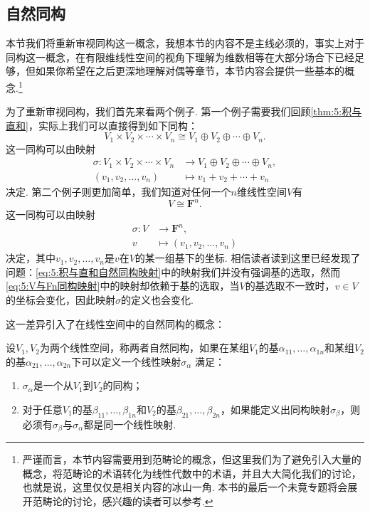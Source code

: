 \subsection{自然同构}

本节我们将重新审视同构这一概念，我想本节的内容不是主线必须的，事实上对于同构这一概念，在有限维线性空间的视角下理解为维数相等在大部分场合下已经足够，但如果你希望在之后更深地理解对偶等章节，本节内容会提供一些基本的概念.\footnote{严谨而言，本节内容需要用到范畴论的概念，但这里我们为了避免引入大量的概念，将范畴论的术语转化为线性代数中的术语，并且大大简化我们的讨论，也就是说，这里仅仅是相关内容的冰山一角. 本书的最后一个未竟专题将会展开范畴论的讨论，感兴趣的读者可以参考.}

为了重新审视同构，我们首先来看两个例子. 第一个例子需要我们回顾\autoref{thm:5:积与直和}，实际上我们可以直接得到如下同构：
\begin{equation} \label{eq:5:积与直和自然同构}
    V_1\times V_2\times\cdots\times V_n\cong V_1\oplus V_2\oplus\cdots\oplus V_n.
\end{equation}
这一同构可以由映射
\begin{equation} \label{eq:5:积与直和自然同构映射}
    \begin{aligned}
        \sigma:V_1\times V_2\times\cdots\times V_n&\to V_1\oplus V_2\oplus\cdots\oplus V_n,\\
        (v_1,v_2,\ldots,v_n)&\mapsto v_1+v_2+\cdots+v_n
    \end{aligned}
\end{equation}
决定. 第二个例子则更加简单，我们知道对任何一个$n$维线性空间$V$有
\begin{equation} \label{eq:5:V与Fn同构}
    V\cong\mathbf{F}^n.
\end{equation}
这一同构可以由映射
\begin{equation} \label{eq:5:V与Fn同构映射}
    \begin{aligned}
        \sigma:V&\to\mathbf{F}^n,\\
        v&\mapsto(v_1,v_2,\ldots,v_n)
    \end{aligned}
\end{equation}
决定，其中$v_1,v_2,\ldots,v_n$是$v$在$V$的某一组基下的坐标. 相信读者读到这里已经发现了问题：\autoref{eq:5:积与直和自然同构映射}中的映射我们并没有强调基的选取，然而\autoref{eq:5:V与Fn同构映射}中的映射却依赖于基的选取，当$V$的基选取不一致时，$v\in V$的坐标会变化，因此映射$\sigma$的定义也会变化.

这一差异引入了在线性空间中的自然同构的概念：
\begin{definition}
    设$V_1,V_2$为两个线性空间，称两者自然同构，如果在某组$V_1$的基$\alpha_{11},\ldots,\alpha_{1n}$和某组$V_2$的基$\alpha_{21},\ldots,\alpha_{2n}$下可以定义一个线性映射$\sigma_\alpha$ 满足：
    \begin{enumerate}
        \item $\sigma_\alpha$是一个从$V_1$到$V_2$的同构；
        \item 对于任意$V_1$的基$\beta_{11},\ldots,\beta_{1n}$和$V_2$的基$\beta_{21},\ldots,\beta_{2n}$，如果能定义出同构映射$\sigma_\beta$，则必须有$\sigma_\beta$与$\sigma_\alpha$都是同一个线性映射.
    \end{enumerate}
\end{definition}

